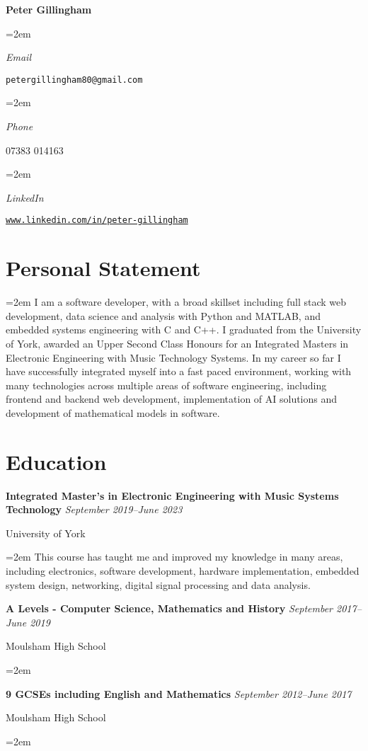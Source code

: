 \documentclass[12pt]{article} %
\newlength{\spacebox}
\newcommand{\sepspace}{\vspace*{1em}}
\newcommand{\name}[1]{
\Huge %
\fontfamily{phv}\selectfont %
\begin{center} \textbf{#1} \end{center}\par
\normalsize\normalfont}
\newcommand{\info}[2]{
    \noindent\hangindent=2em\hangafter=0
    \parbox{\spacebox}{%
    \textsl{#1}} %
    #2 \par} %
\newcommand{\education}[4]{
\noindent  \textbf{#1}
  \newline
  \noindent \textit{#2} \par
  \noindent #3 \par
\vspace*{0.5em}
  \noindent\hangindent=2em\hangafter=0 \small #4
\normalsize \par}
\newcommand{\personalstatement}[1]{
  \vspace*{0.5em}
  \noindent\hangindent=2em\hangafter=0 \small #1 
\normalsize \par}
\begin{document}
\name{Peter Gillingham}
\vspace*{-10pt}

\sepspace
\info{Email}{\texttt{petergillingham80@gmail.com}}
\info{Phone}{07383 014163}
\info{LinkedIn}{\texttt{\url{www.linkedin.com/in/peter-gillingham}}}

\section*{Personal Statement}
\personalstatement{I am a software developer, with a broad skillset including full stack web development, data science and analysis with Python and MATLAB, and embedded systems engineering with C and C++. I graduated from the University of York, awarded an Upper Second Class Honours for an Integrated Masters in Electronic Engineering with Music Technology Systems. In my career so far I have successfully integrated myself into a fast paced environment, working with many technologies across multiple areas of software engineering, including frontend and backend web development, implementation of AI solutions and development of mathematical models in software.}

\section*{Education}

\education{Integrated Master's in Electronic Engineering with Music Systems Technology}{September 2019--June 2023}{University of York}{This course has taught me and improved my knowledge in many areas, including electronics, software development, hardware implementation, embedded system design, networking, digital signal processing and data analysis. \\}

\education{A Levels - Computer Science, Mathematics and History}{September 2017--June 2019}{Moulsham High School}{}

\education{9 GCSEs including English and Mathematics}{September 2012--June 2017}{Moulsham High School}{}

\end{document}
